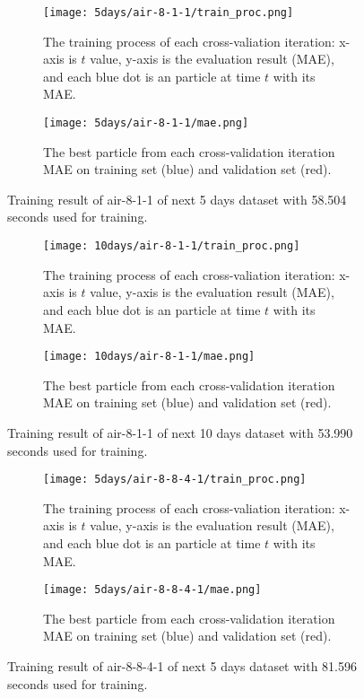 \begin{figure}[htp]
    \begin{subfigure}{\textwidth}  
        \centering
        \texttt{[image: 5days/air-8-1-1/train\_proc.png]}
        \caption{The training process of each cross-valiation iteration: x-axis is $t$ value, y-axis is the evaluation result (MAE), 
        and each blue dot is an particle at time $t$ with its MAE.}
        \label{fig:4a}
    \end{subfigure}
    \begin{subfigure}{\textwidth}  
        \centering
        \texttt{[image: 5days/air-8-1-1/mae.png]}
        \caption{The best particle from each cross-validation iteration MAE on training set (blue) and validation set (red).}
        \label{fig:4b}
    \end{subfigure}
    \caption{Training result of air-8-1-1 of next 5 days dataset with 58.504 seconds used for training.}
    \label{fig:4}
\end{figure}
\FloatBarrier

\begin{figure}[htp]
    \begin{subfigure}{\textwidth}  
        \centering
        \texttt{[image: 10days/air-8-1-1/train\_proc.png]}
        \caption{The training process of each cross-valiation iteration: x-axis is $t$ value, y-axis is the evaluation result (MAE), 
        and each blue dot is an particle at time $t$ with its MAE.}
        \label{fig:5a}
    \end{subfigure}
    \begin{subfigure}{\textwidth}  
        \centering
        \texttt{[image: 10days/air-8-1-1/mae.png]}
        \caption{The best particle from each cross-validation iteration MAE on training set (blue) and validation set (red).}
        \label{fig:5b}
    \end{subfigure}
    \caption{Training result of air-8-1-1 of next 10 days dataset with 53.990 seconds used for training.}
    \label{fig:5}
\end{figure}
\FloatBarrier

\begin{figure}[htp]
    \begin{subfigure}{\textwidth}  
        \centering
        \texttt{[image: 5days/air-8-8-4-1/train\_proc.png]}
        \caption{The training process of each cross-valiation iteration: x-axis is $t$ value, y-axis is the evaluation result (MAE), 
        and each blue dot is an particle at time $t$ with its MAE.}
        \label{fig:6a}
    \end{subfigure}
    \begin{subfigure}{\textwidth}  
        \centering
        \texttt{[image: 5days/air-8-8-4-1/mae.png]}
        \caption{The best particle from each cross-validation iteration MAE on training set (blue) and validation set (red).}
        \label{fig:6b}
    \end{subfigure}
    \caption{Training result of air-8-8-4-1 of next 5 days dataset with 81.596 seconds used for training.}
    \label{fig:6}
\end{figure}
\FloatBarrier

